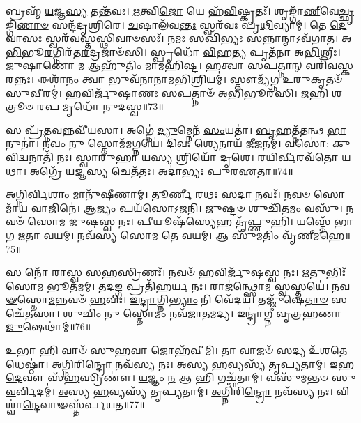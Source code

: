 𑌬𑍍𑌰𑌹𑍍𑌮᳴ \ul{𑌯}\-𑌜𑍍𑌞\-\ul{𑌸𑍍𑌯} 𑌤𑌨𑍍𑌤᳴𑌵𑌃।
\-\ul{𑌋}\-𑌤𑍍𑌵𑌿\-\ul{𑌜𑍋} 𑌯𑍇 𑌹᳴\-\ul{𑌵𑌿}\-𑌷𑍍𑌕𑍃𑌤𑌃᳴।
𑌶𑍃𑌙𑍍𑌗𑌾᳴\-\ul{𑌣𑍀}\-𑌵𑍇\-\ul{𑌚𑍍𑌛𑍃}\-𑌙𑍍𑌗𑌿\-\ul{𑌣𑌾}\-\-\ul{𑍞} 𑌸𑌨𑍍𑌦᳴𑌦𑍃𑌶𑍍𑌰𑌿𑌰𑍇।
\-\ul{𑌚}\-𑌷𑌾𑌲᳴𑌵\-\ul{𑌨𑍍𑌤𑌃} 𑌸𑍍𑌵𑌰᳴𑌵𑌃 𑌪𑍃\-\ul{𑌥𑌿}\-𑌵𑍍𑌯𑌾𑌮𑍍।
𑌤𑍇 \ul{𑌦𑍇}\-𑌵𑌾\-\ul{𑌸𑌃} 𑌸𑍍𑌵𑌰᳴𑌵𑌸𑍍𑌤\-\ul{𑌸𑍍𑌥𑌿}\-𑌵𑌾𑍞𑌸𑌃᳴।
𑌨\-\ul{𑌮𑌃} 𑌸𑌖𑌿᳴𑌭𑍍𑌯𑌃 \ul{𑌸}\-𑌨𑍍𑌨𑌾𑌨𑍍𑌮𑌾\-𑌽𑌵᳴𑌗𑌾𑌤।
\-\ul{𑌅}\-\-\ul{𑌭𑌿}\-𑌭𑍂\-\ul{𑌰}\-𑌗𑍍𑌨𑌿𑌰᳴𑌤\-\ul{𑌰}\-𑌦𑍍𑌰𑌜𑌾𑍞᳴𑌸𑌿।
𑌸𑍍𑌪𑍃𑌧𑍋᳴ \ul{𑌵𑌿}\-𑌹\-\ul{𑌤𑍍𑌯} 𑌪𑍃𑌤᳴𑌨𑌾 𑌅\-\ul{𑌭𑌿}\-𑌶𑍍𑌰𑍀𑌃।
\-\ul{𑌜𑍁}\-\-\ul{𑌷𑌾}\-𑌣𑍋 \ul{𑌮} 𑌆𑌹𑍁᳴𑌤𑌿𑌂 𑌮𑌾𑌮𑌹𑌿𑌷𑍍𑌟।
\-\ul{𑌹}\-𑌤𑍍𑌵𑌾 \ul{𑌸}\-𑌪\-\ul{𑌤𑍍𑌨𑌾}\-\-\ul{𑌨𑍍} 𑌵𑌰𑌿᳴𑌵𑌸𑍍𑌕𑌰𑌨𑍍𑌨𑌃।
𑌈𑌶𑌾᳴𑌨𑌂 \ul{𑌤𑍍𑌵𑌾} 𑌭𑍁𑌵᳴𑌨𑌾𑌨𑌾𑌮\-\ul{𑌭𑌿}\-𑌶𑍍𑌰𑌿𑌯𑌮𑍍॑।
𑌸𑍍𑌤𑍗𑌮𑍍𑌯᳴𑌗𑍍𑌨 𑌉\-\ul{𑌰𑍁}\-𑌕𑍃𑌤𑍞᳴ \ul{𑌸𑍁}\-𑌵𑍀𑌰𑌮𑍍॑।
\-\ul{𑌹}\-𑌵𑌿𑌰𑍍𑌜𑍁᳴\-\ul{𑌷𑌾}\-𑌣𑌃 \ul{𑌸}\-𑌪𑌤𑍍𑌨𑌾𑍞᳴ 𑌅\-\ul{𑌭𑌿}\-𑌭𑍂𑌰᳴𑌸𑌿।
\-\ul{𑌜}\-𑌹𑌿 𑌶\-\ul{𑌤𑍍𑌰𑍂}\-\-\ul{𑍞} 𑌰\-\ul{𑌪} 𑌮𑍃𑌧𑍋᳴ 𑌨𑍁𑌦𑌸𑍍𑌵॥73॥\anuvakamend[\-\ul{𑌵𑌿}\-𑌶𑌾𑌂 𑌜᳴𑌯𑌾𑌮𑌸𑌿 𑌜𑍀𑌰𑌦𑌾\-\ul{𑌨𑍋} 𑌹\-\ul{𑌰𑍍𑌯𑌾} 𑌵𑌿\-\ul{𑌶𑍍𑌵𑌾} 𑌦𑌿𑌵𑌿᳴𑌷𑍍𑌟𑌿\-\ul{𑌷𑍁} 𑌵𑌸𑍂᳴𑌨𑌿 𑌜𑌿\-\ul{𑌗𑍀}\-𑌵𑌾𑌨𑍍𑌥𑍍𑌸𑌹𑍋᳴𑌭𑌿\-\ul{𑌰𑍍𑌮𑌿}\-𑌤𑌾 𑌨᳴\-\ul{𑌶𑍍𑌚}\-𑌤𑍍𑌵𑌾𑌰𑌿᳴ 𑌚]

𑌸 𑌪𑍍𑌰᳴\-\ul{𑌤𑍍𑌨}\-𑌵𑌨𑍍𑌨𑌵𑍀᳴𑌯𑌸𑌾।
𑌅𑌗𑍍𑌨𑍇॑ \ul{𑌦𑍍𑌯𑍁}\-𑌮𑍍𑌨𑍇𑌨᳴ \ul{𑌸𑌂}\-𑌯𑌤𑌾॑।
\-\ul{𑌬𑍃}\-𑌹𑌤𑍍𑌤᳴𑌤𑌨𑍍𑌥 \ul{𑌭𑌾}\-𑌨𑍁𑌨𑌾॑।
𑌨\-\ul{𑌵𑌂} 𑌨𑍁 𑌸𑍍𑌤𑍋𑌮᳴\-\ul{𑌮}\-𑌗𑍍𑌨𑌯𑍇॑।
\-\ul{𑌦𑌿}\-𑌵𑌃 \ul{𑌶𑍍𑌯𑍇}\-𑌨𑌾𑌯᳴ 𑌜𑍀𑌜𑌨𑌮𑍍।
𑌵𑌸𑍋॑: \ul{𑌕𑍁}\-𑌵𑌿\-\ul{𑌦𑍍𑌵}\-𑌨𑌾𑌤𑌿᳴ 𑌨𑌃।
\-\ul{𑌸𑍍𑌵𑌾}\-\-\ul{𑌰𑍁}\-𑌹𑌾 𑌯\-\ul{𑌸𑍍𑌯} 𑌶𑍍𑌰𑌿𑌯𑍋᳴ \ul{𑌦𑍃}\-𑌶𑍇।
\-\ul{𑌰}\-𑌯𑌿\-\ul{𑌰𑍍𑌵𑍀}\-𑌰𑌵᳴𑌤𑍋 𑌯𑌥𑌾।
𑌅𑌗𑍍𑌰𑍇᳴ \ul{𑌯}\-𑌜𑍍𑌞\-\ul{𑌸𑍍𑌯} 𑌚𑍇𑌤᳴𑌤𑌃।
𑌅𑌦𑌾॑𑌭𑍍𑌯𑌃 𑌪𑍁𑌰\-\ul{𑌏}\-𑌤𑌾॥74॥

\-\ul{𑌅}\-𑌗𑍍𑌨𑌿\-\ul{𑌰𑍍𑌵𑌿}\-𑌶𑌾𑌂 𑌮𑌾𑌨𑍁᳴𑌷𑍀𑌣𑌾𑌮𑍍।
𑌤𑍂\-\ul{𑌰𑍍𑌣𑍀} 𑌰\-\ul{𑌥𑌃} 𑌸\-\ul{𑌦𑌾} 𑌨𑌵𑌃᳴।
𑌨\-\ul{𑌵}\-\-\ul{𑍞} 𑌸𑍋𑌮𑌾᳴𑌯 \ul{𑌵𑌾}\-𑌜𑌿𑌨𑍇॑।
𑌆\-\ul{𑌜𑍍𑌯𑌂} 𑌪𑌯᳴𑌸𑍋𑌽𑌜𑌨𑌿।
𑌜𑍁\-\ul{𑌷𑍍𑌟}\-\-\ul{𑍞} 𑌶𑍁𑌚𑌿᳴𑌤\-\ul{𑌮𑌂} 𑌵𑌸𑍁᳴।
𑌨𑌵𑍞᳴ 𑌸𑍋𑌮 𑌜𑍁𑌷𑌸𑍍𑌵 𑌨𑌃।
\-\ul{𑌪𑍀}\-𑌯𑍂𑌷᳴\-\ul{𑌸𑍍𑌯𑍇}\-𑌹 𑌤𑍃᳴𑌪𑍍𑌣𑍁𑌹𑌿।
𑌯𑌸𑍍𑌤𑍇᳴ \ul{𑌭𑌾}\-𑌗 \ul{𑌋}\-𑌤𑌾 \ul{𑌵}\-𑌯𑌮𑍍।
𑌨𑌵᳴𑌸𑍍𑌯 𑌸𑍋𑌮 𑌤𑍇 \ul{𑌵}\-𑌯𑌮𑍍।
𑌆 𑌸𑍁᳴\-\ul{𑌮}\-𑌤𑌿𑌂 𑌵𑍃᳴𑌣𑍀𑌮𑌹𑍇॥75॥

𑌸 𑌨𑍋᳴ 𑌰𑌾𑌸𑍍𑌵 𑌸\-\ul{𑌹}\-𑌸𑍍𑌰𑌿𑌣𑌃᳴।
𑌨𑌵𑍞᳴ \ul{𑌹}\-𑌵𑌿𑌰𑍍𑌜𑍁᳴𑌷𑌸𑍍𑌵 𑌨𑌃।
\-\ul{𑌋}\-𑌤𑍁𑌭𑌿𑌃᳴ 𑌸𑍋\-\ul{𑌮} 𑌭𑍂𑌤᳴𑌮𑌮𑍍।
𑌤\-\ul{𑌦}\-𑌙𑍍𑌗 𑌪𑍍𑌰𑌤𑌿᳴\-𑌹𑌰𑍍𑌯 𑌨𑌃।
𑌰𑌾𑌜॑𑌨𑍍𑌥𑍍𑌸𑍋𑌮 \ul{𑌸𑍍𑌵}\-𑌸𑍍𑌤𑌯𑍇॑।
𑌨\-\ul{𑌵}\-\-\ul{𑍟}\-𑌸𑍍𑌤𑍋\-\ul{𑌮}\-𑌨𑍍𑌨𑌵𑍞᳴ \ul{𑌹}\-𑌵𑌿𑌃।
\-\ul{𑌇}\-\-\ul{𑌨𑍍𑌦𑍍𑌰𑌾}\-𑌗𑍍𑌨𑌿\-\ul{𑌭𑍍𑌯𑌾𑌂} 𑌨𑌿 𑌵𑍇᳴𑌦𑌯।
𑌤𑌜𑍍𑌜𑍁᳴𑌷𑍇\-\ul{𑌤𑌾}\-\-\ul{𑍞} 𑌸𑌚𑍇᳴𑌤𑌸𑌾।
𑌶𑍁\-\ul{𑌚𑌿𑌂} 𑌨𑍁 𑌸𑍍𑌤𑍋\-\ul{𑌮𑌂} 𑌨𑌵᳴𑌜𑌾𑌤\-\ul{𑌮}\-𑌦𑍍𑌯।
𑌇𑌨𑍍𑌦𑍍𑌰𑌾॑𑌗𑍍𑌨𑍀 𑌵𑍃𑌤𑍍𑌰𑌹𑌣𑌾 \ul{𑌜𑍁}\-𑌷𑍇𑌥𑌾॑𑌮𑍍॥76॥

\-\ul{𑌉}\-𑌭𑌾 𑌹𑌿 𑌵𑌾𑍞᳴ \ul{𑌸𑍁}\-𑌹\-\ul{𑌵𑌾} 𑌜𑍋𑌹᳴𑌵𑍀𑌮𑌿।
𑌤𑌾 𑌵𑌾𑌜𑍞᳴ \ul{𑌸}\-𑌦𑍍𑌯 𑌉᳴\-\ul{𑌶}\-𑌤𑍇 𑌧𑍇𑌷𑍍𑌠𑌾॑।
\-\ul{𑌅}\-𑌗𑍍𑌨𑌿𑌰𑌿\-\ul{𑌨𑍍𑌦𑍍𑌰𑍋} 𑌨𑌵᳴𑌸𑍍𑌯 𑌨𑌃।
\-\ul{𑌅}\-𑌸𑍍𑌯 \ul{𑌹}\-𑌵𑍍𑌯𑌸𑍍𑌯᳴ 𑌤𑍃𑌪𑍍𑌯𑌤𑌾𑌮𑍍।
\-\ul{𑌇}\-𑌹 \ul{𑌦𑍇}\-𑌵𑍗 𑌸᳴\-\ul{𑌹}\-𑌸𑍍𑌰𑌿𑌣𑍗॑।
\-\ul{𑌯}\-𑌜𑍍𑌞𑌂 \ul{𑌨} 𑌆 𑌹𑌿 𑌗𑌚𑍍𑌛᳴𑌤𑌾𑌮𑍍।
𑌵𑌸𑍁᳴𑌮𑌨𑍍𑌤𑍞 𑌸𑍁\-\ul{𑌵}\-𑌰𑍍𑌵𑌿𑌦𑌮𑍍॑।
\-\ul{𑌅}\-𑌸𑍍𑌯 \ul{𑌹}\-𑌵𑍍𑌯𑌸𑍍𑌯᳴ 𑌤𑍃𑌪𑍍𑌯𑌤𑌾𑌮𑍍।
\-\ul{𑌅}\-𑌗𑍍𑌨𑌿𑌰𑌿\-\ul{𑌨𑍍𑌦𑍍𑌰𑍋} 𑌨𑌵᳴𑌸𑍍𑌯 𑌨𑌃।
𑌵𑌿𑌶𑍍𑌵𑌾॑\-\ul{𑌨𑍍𑌦𑍇}\-𑌵𑌾𑍟𑌸𑍍𑌤᳴𑌰𑍍𑌪𑌯𑌤॥77॥

